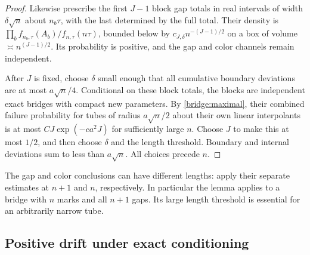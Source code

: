 \begin{proof}
Likewise prescribe the first $J-1$ block gap totals in real intervals
of width $\delta\sqrt n$ about $n_b\tau$, with the last determined by
the full total. Their density is
$\prod_b f_{n_b,\tau}(A_b)/f_{n,\tau}(n\tau)$, bounded below by
$c_{J,\delta}n^{-(J-1)/2}$ on a box of volume
$\asymp n^{(J-1)/2}$. Its probability is positive, and the gap and
color channels remain independent.

After $J$ is fixed, choose $\delta$ small enough that all cumulative
boundary deviations are at most $a\sqrt n/4$. Conditional on these
block totals, the blocks are independent exact bridges with compact
new parameters. By \eqref{bridge:maximal}, their combined failure
probability for tubes of radius $a\sqrt n/2$ about their own linear
interpolants is at most $CJ\exp(-ca^2J)$ for sufficiently large $n$.
Choose $J$ to make this at most $1/2$, and then choose $\delta$ and
the length threshold. Boundary and internal deviations sum to less
than $a\sqrt n$. All choices precede $n$.
\end{proof}

The gap and color conclusions can have different lengths: apply their
separate estimates at $n+1$ and $n$, respectively. In particular the
lemma applies to a bridge with $n$ marks and all $n+1$ gaps. Its large
length threshold is essential for an arbitrarily narrow tube.

\subsection{Positive drift under exact conditioning}

